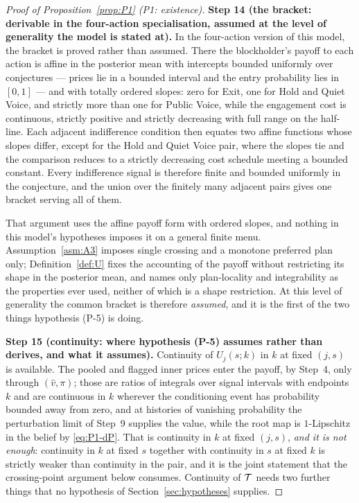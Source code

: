 \begin{proof}[Proof of Proposition~\ref{prop:P1} (P1: existence)]
\smallskip
\noindent\textbf{Step 14 (the bracket: derivable in the four-action specialisation, assumed at the
level of generality the model is stated at).}
In the four-action version of this model, the bracket is proved rather than assumed. There the
blockholder's payoff to each action is affine in the posterior mean with intercepts bounded uniformly
over conjectures --- prices lie in a bounded interval and the entry probability lies in $[0,1]$ ---
and with totally ordered slopes: zero for Exit, one for Hold and Quiet Voice, and strictly more than
one for Public Voice, while the engagement cost is continuous, strictly positive and strictly
decreasing with full range on the half-line. Each adjacent indifference condition then equates two
affine functions whose slopes differ, except for the Hold and Quiet Voice pair, where the slopes tie
and the comparison reduces to a strictly decreasing cost schedule meeting a bounded constant. Every
indifference signal is therefore finite and bounded uniformly in the conjecture, and the union over
the finitely many adjacent pairs gives one bracket serving all of them.

That argument uses the affine payoff form with ordered slopes, and nothing in this model's
hypotheses imposes it on a general finite menu. Assumption~\ref{asm:A3} imposes single crossing and a
monotone preferred plan only; Definition~\ref{def:U} fixes the accounting of the payoff without
restricting its shape in the posterior mean, and names only plan-locality and integrability as the
properties ever used, neither of which is a shape restriction. At this level of generality the common
bracket is therefore \emph{assumed}, and it is the first of the two things hypothesis (P-5) is doing.

\smallskip
\noindent\textbf{Step 15 (continuity: where hypothesis (P-5) assumes rather than derives, and what it
assumes).}
Continuity of $U_j(s;k)$ in $k$ at fixed $(j,s)$ is available. The pooled and flagged inner prices
enter the payoff, by Step~4, only through $(\hat v,\pi)$; those are ratios of integrals over signal
intervals with endpoints $k$ and are continuous in $k$ wherever the conditioning event has
probability bounded away from zero, and at histories of vanishing probability the perturbation limit
of Step~9 supplies the value, while the root map is $1$-Lipschitz in the belief by
\eqref{eq:P1-dP}. That is continuity in $k$ at fixed $(j,s)$, \emph{and it is not enough}: continuity
in $k$ at fixed $s$ together with continuity in $s$ at fixed $k$ is strictly weaker than continuity
in the pair, and it is the joint statement that the crossing-point argument below consumes.
Continuity of $\mathcal{T}$ needs two further things that no hypothesis of
Section~\ref{sec:hypotheses} supplies.


\end{proof}
